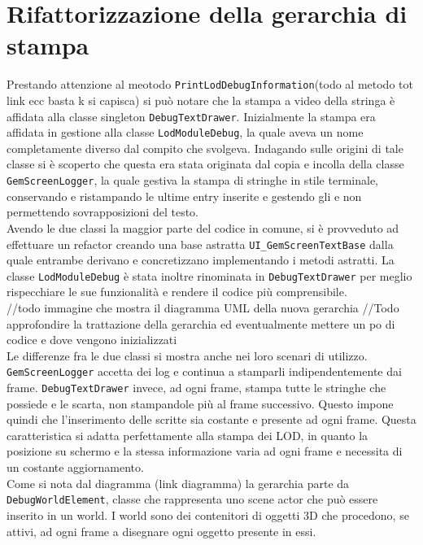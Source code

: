 
\section{Rifattorizzazione della gerarchia di stampa}

Prestando attenzione al meotodo \texttt{PrintLodDebugInformation}(todo al metodo tot link ecc basta k si capisca) si può notare che la stampa a video della stringa è affidata alla classe singleton \texttt{DebugTextDrawer}. Inizialmente la stampa era affidata in gestione alla classe \texttt{LodModuleDebug}, la quale aveva un nome completamente diverso dal compito che svolgeva. Indagando sulle origini di tale classe si è scoperto che questa era stata originata dal copia e incolla della classe \texttt{GemScreenLogger}, la quale gestiva la stampa di stringhe in stile terminale, conservando e ristampando le ultime entry inserite e gestendo gli  e non permettendo sovrapposizioni del testo.\\

Avendo le due classi la maggior parte del codice in comune, si è provveduto ad effettuare un refactor creando una base astratta \texttt{UI\_GemScreenTextBase} dalla quale entrambe derivano e concretizzano implementando i metodi astratti. La classe \texttt{LodModuleDebug} è stata inoltre rinominata in \texttt{DebugTextDrawer} per meglio rispecchiare le sue funzionalità e rendere il codice più comprensibile.\\

//todo immagine che mostra il diagramma UML della nuova gerarchia
//Todo approfondire la trattazione della gerarchia ed eventualmente mettere un po di codice e dove vengono inizializzati\\

Le differenze fra le due classi si mostra anche nei loro scenari di utilizzo. \texttt{GemScreenLogger} accetta dei log e continua a stamparli indipendentemente dai frame. \texttt{DebugTextDrawer} invece, ad ogni frame, stampa tutte le stringhe che possiede e le scarta, non stampandole più al frame successivo. Questo impone quindi che l'inserimento delle scritte sia costante e presente ad ogni frame. Questa caratteristica si adatta perfettamente alla stampa dei LOD, in quanto la posizione su schermo e la stessa informazione varia ad ogni frame e necessita di un costante aggiornamento.\\ 

Come si nota dal diagramma (link diagramma) la gerarchia parte da \texttt{DebugWorldElement}, classe che rappresenta uno scene actor che può essere inserito in un world. I world sono dei contenitori di oggetti 3D che procedono, se attivi, ad ogni frame a disegnare ogni oggetto presente in essi.\\


